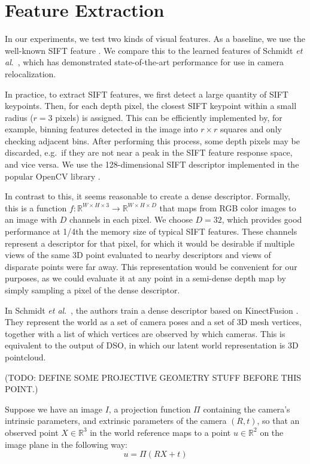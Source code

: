 \section{Feature Extraction}
In our experiments, we test two kinds of visual features. As a baseline, we use the well-known SIFT feature \cite{lowe1999object}. We compare this to the learned features of Schmidt \textit{et al}.\ \cite{schmidt2017self}, which has demonstrated state-of-the-art performance for use in camera relocalization.

In practice, to extract SIFT features, we first detect a large quantity of SIFT keypoints. Then, for each depth pixel, the closest SIFT keypoint within a small radius ($r=3$ pixels) is assigned. This can be efficiently implemented by, for example, binning features detected in the image into $r \times r$ squares and only checking adjacent bins. After performing this process, some depth pixels may be discarded, e.g.\ if they are not near a peak in the SIFT feature response space, and vice versa. We use the 128-dimensional SIFT descriptor implemented in the popular OpenCV library \cite{opencv_library}.

In contrast to this, it seems reasonable to create a dense descriptor. Formally, this is a function $f : \mathbb{R}^{W \times H \times 3} \to \mathbb{R}^{W \times H \times D} $ that maps from RGB color images to an image with $D$ channels in each pixel. We choose $D=32$, which provides good performance at 1/4th the memory size of typical SIFT features. These channels represent a descriptor for that pixel, for which it would be desirable if multiple views of the same 3D point evaluated to nearby descriptors and views of disparate points were far away. This representation would be convenient for our purposes, as we could evaluate it at any point in a semi-dense depth map by simply sampling a pixel of the dense descriptor.

In Schmidt \textit{et al}.\ \cite{schmidt2017self}, the authors train a dense descriptor based on KinectFusion \cite{newcombe2011kinectfusion}. They represent the world as a set of camera poses and a set of 3D mesh vertices, together with a list of which vertices are observed by which cameras. This is equivalent to the output of DSO, in which our latent world representation is 3D pointcloud. 

(TODO: DEFINE SOME PROJECTIVE GEOMETRY STUFF BEFORE THIS POINT.)

Suppose we have an image $I$, a projection function $\Pi$ containing the camera's intrinsic parameters, and extrinsic parameters of the camera $(R, t)$, so that an observed point $X \in \mathbb{R}^3$ in the world reference maps to a point $u \in \mathbb{R}^2$ on the image plane in the following way:
\begin{equation}
u = \Pi(RX + t)
\end{equation}

